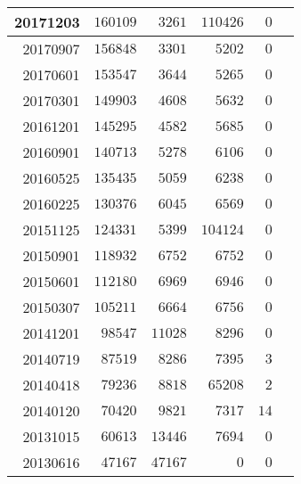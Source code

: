 \documentclass[hidelinks,a4paper,12pt]{article}
\begin{document}
\begin{center}
\begin{tabular}{|r|r|r|r|r|r|}
20171203         & $160109$         & $3261$         & $110426$         & $0$              \\ \hline
20170907         & $156848$         & $3301$         & $5202$           & $0$              \\ \hline
20170601         & $153547$         & $3644$         & $5265$           & $0$              \\ \hline
20170301         & $149903$         & $4608$         & $5632$           & $0$              \\ \hline
20161201         & $145295$         & $4582$         & $5685$           & $0$              \\ \hline
20160901         & $140713$         & $5278$         & $6106$           & $0$              \\ \hline
20160525         & $135435$         & $5059$         & $6238$           & $0$              \\ \hline
20160225         & $130376$         & $6045$         & $6569$           & $0$              \\ \hline
20151125         & $124331$         & $5399$         & $104124$         & $0$              \\ \hline
20150901         & $118932$         & $6752$         & $6752$           & $0$              \\ \hline
20150601         & $112180$         & $6969$         & $6946$           & $0$              \\ \hline
20150307         & $105211$         & $6664$         & $6756$           & $0$              \\ \hline
20141201         & $98547$          & $11028$        & $8296$           & $0$              \\ \hline
20140719         & $87519$          & $8286$         & $7395$           & $3$              \\ \hline
20140418         & $79236$          & $8818$         & $65208$          & $2$              \\ \hline
20140120         & $70420$          & $9821$         & $7317$           & $14$             \\ \hline
20131015         & $60613$          & $13446$        & $7694$           & $0$              \\ \hline
20130616         & $47167$          & $47167$        & $0$              & $0$              \\ \hline
\end{tabular}
\end{center}
\end{document}
